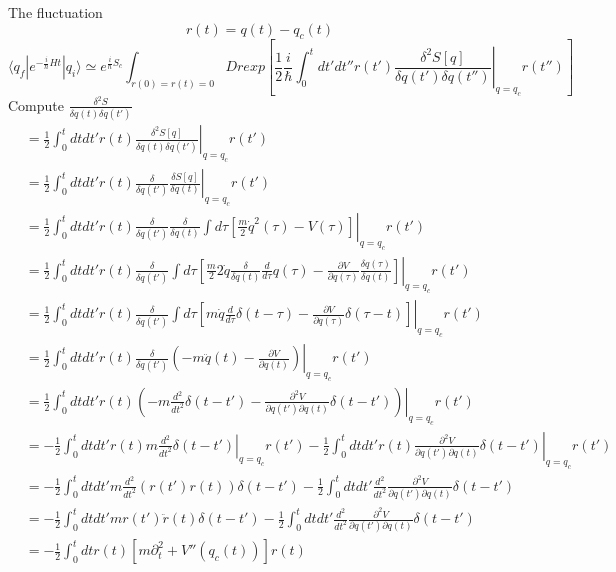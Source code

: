 \documentclass[a4paper,11pt]{article}
\begin{document}
The fluctuation
\begin{equation*}
  r(t)=q(t)-q_{c}(t)
\end{equation*}
\begin{equation*}
  \langle q_f|e^{-\frac{i}{\hbar}Ht}|q_{i}\rangle\simeq e^{\frac{i}{\hbar}S_c}\int_{r(0)=r(t)=0}Drexp\left[\left.\frac{1}{2}\frac{i}{\hbar}\int_{0}^{t}dt'dt''r(t')\frac{\delta^2S[q]}{\delta q(t')\delta q(t'')}\right|_{q=q_c}r(t'')\right]
\end{equation*}
Compute $\frac{\delta^2 S}{\delta q(t)\delta q(t')}$
\begin{equation*}
  \begin{split}
      &=\frac{1}{2}\int_{0}^{t}dtdt'r(t)\left.\frac{\delta^2S[q]}{\delta q(t)\delta q(t')}\right|_{q=q_c}r(t')\\
       &=\frac{1}{2}\int_{0}^{t}dtdt'r(t)\left.\frac{\delta}{\delta q(t')}\frac{\delta S[q]}{\delta q(t)}\right|_{q=q_c}r(t')\\
       &=\frac{1}{2}\int_{0}^{t}dtdt'r(t)\left.\frac{\delta}{\delta q(t')}\frac{\delta}{\delta q(t)}\int d\tau[\frac{m}{2}\dot{q}^2(\tau)-V(\tau)]\right|_{q=q_c}r(t')\\
       &=\frac{1}{2}\int_{0}^{t}dtdt'r(t)\left.\frac{\delta}{\delta q(t')}\int d\tau\left[\frac{m}{2}2\dot{q}\frac{\delta}{\delta q(t)}\frac{d}{d\tau}q(\tau)-\frac{\partial V}{\partial q(\tau)}\frac{\delta q(\tau)}{\delta q(t)}\right]\right|_{q=q_c}r(t')\\
       &=\frac{1}{2}\int_{0}^{t}dtdt'r(t)\left.\frac{\delta}{\delta q(t')}\int d\tau\left[m\dot{q}\frac{d}{d\tau}\delta(t-\tau)-\frac{\partial V}{\partial q(\tau)}\delta(\tau-t)\right]\right|_{q=q_c}r(t')\\
       &=\frac{1}{2}\int_{0}^{t}dtdt'r(t)\left.\frac{\delta}{\delta q(t')}\left(-m\ddot{q}(t)-\frac{\partial V}{\partial q(t)}\right)\right|_{q=q_c}r(t')\\
       &=\frac{1}{2}\int_{0}^{t}dtdt'r(t)\left.\left(-m\frac{d^2}{dt^2}\delta(t-t')-\frac{\partial^2V}{\partial q(t')\partial q(t)}\delta(t-t')\right)\right|_{q=q_c}r(t')\\
       &=-\frac{1}{2}\int_{0}^{t}dtdt'r(t)\left.m\frac{d^2}{dt^2}\delta(t-t')\right|_{q=q_c}r(t')-\frac{1}{2}\int_{0}^{t}dtdt'\left.r(t)\frac{\partial^2V}{\partial q(t')\partial q(t)}\delta(t-t')\right|_{q=q_c}r(t')\\
       &=-\frac{1}{2}\int_{0}^{t}dtdt'm\frac{d^2}{dt^2}\left(r(t')r(t)\right)\delta(t-t')-\frac{1}{2}\int_{0}^{t}dtdt'\frac{d^2}{dt^2}\frac{\partial^2V}{\partial q(t')\partial q(t)}\delta(t-t')\\
       &=-\frac{1}{2}\int_{0}^{t}dtdt'mr(t')\ddot{r}(t)\delta(t-t')-\frac{1}{2}\int_{0}^{t}dtdt'\frac{d^2}{dt^2}\frac{\partial^2V}{\partial q(t')\partial q(t)}\delta(t-t')\\
       &=-\frac{1}{2}\int_{0}^{t}dtr(t)[m\partial_t^2+V''(q_{c}(t))]r(t)
  \end{split}
\end{equation*}
\end{document}
